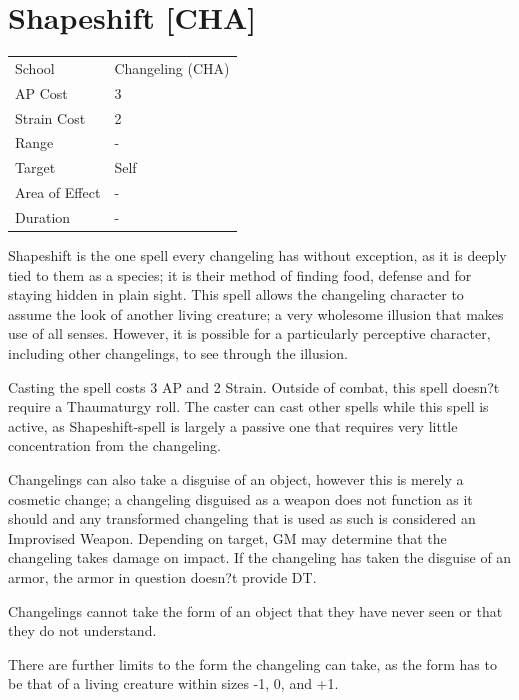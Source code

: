 \documentclass[11pt,a4paper,twocolumn]{book}
\begin{document}
		\section*{Shapeshift [CHA]}
	{
		\begin{tabu} to 75mm{| X[l,4] | X[l,7] |}
			\hline
			School 			&  Changeling (CHA)\\
			AP Cost	      	&  3				\\
			Strain Cost     &  2				\\
			Range     		&  -				\\
			Target      	&  Self				\\
			Area of Effect  &  -	 			\\
			Duration     	&  -				\\ \hline
		\end{tabu}
		
	}
	
	\medskip
	
	Shapeshift is the one spell every changeling has without exception, as it is deeply tied to them as a species; it is their method of finding food, defense and for staying hidden in plain sight. This spell allows the changeling character to assume the look of another living creature; a very wholesome illusion that makes use of all senses. However, it is possible for a particularly perceptive character, including other changelings, to see through the illusion.
	
	Casting the spell costs 3 AP and 2 Strain. Outside of combat, this spell doesn?t require a Thaumaturgy roll. The caster can cast other spells while this spell is active, as Shapeshift-spell is largely a passive one that requires very little concentration from the changeling.
	
	Changelings can also take a disguise of an object, however this is merely a cosmetic change; a changeling disguised as a weapon does not function as it should and any transformed changeling that is used as such is considered an Improvised Weapon. Depending on target, GM may determine that the changeling takes damage on impact.
	If the changeling has taken the disguise of an armor, the armor in question doesn?t provide DT.
	
	Changelings cannot take the form of an object that they have never seen or that they do not understand.
	
	There are further limits to the form the changeling can take, as the form has to be that of a living creature within sizes -1, 0, and +1.
	
\end{document}
